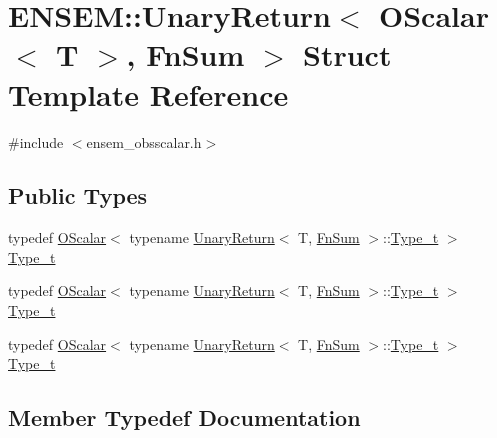\hypertarget{structENSEM_1_1UnaryReturn_3_01OScalar_3_01T_01_4_00_01FnSum_01_4}{}\section{E\+N\+S\+EM\+:\+:Unary\+Return$<$ O\+Scalar$<$ T $>$, Fn\+Sum $>$ Struct Template Reference}
\label{structENSEM_1_1UnaryReturn_3_01OScalar_3_01T_01_4_00_01FnSum_01_4}


{\ttfamily \#include $<$ensem\+\_\+obsscalar.\+h$>$}

\subsection*{Public Types}
\begin{DoxyCompactItemize}
\item 
typedef \mbox{\hyperlink{classENSEM_1_1OScalar}{O\+Scalar}}$<$ typename \mbox{\hyperlink{structENSEM_1_1UnaryReturn}{Unary\+Return}}$<$ T, \mbox{\hyperlink{structENSEM_1_1FnSum}{Fn\+Sum}} $>$\+::\mbox{\hyperlink{structENSEM_1_1UnaryReturn_3_01OScalar_3_01T_01_4_00_01FnSum_01_4_a02ee406ef93cadbda63ffae33a8ef25a}{Type\+\_\+t}} $>$ \mbox{\hyperlink{structENSEM_1_1UnaryReturn_3_01OScalar_3_01T_01_4_00_01FnSum_01_4_a02ee406ef93cadbda63ffae33a8ef25a}{Type\+\_\+t}}
\item 
typedef \mbox{\hyperlink{classENSEM_1_1OScalar}{O\+Scalar}}$<$ typename \mbox{\hyperlink{structENSEM_1_1UnaryReturn}{Unary\+Return}}$<$ T, \mbox{\hyperlink{structENSEM_1_1FnSum}{Fn\+Sum}} $>$\+::\mbox{\hyperlink{structENSEM_1_1UnaryReturn_3_01OScalar_3_01T_01_4_00_01FnSum_01_4_a02ee406ef93cadbda63ffae33a8ef25a}{Type\+\_\+t}} $>$ \mbox{\hyperlink{structENSEM_1_1UnaryReturn_3_01OScalar_3_01T_01_4_00_01FnSum_01_4_a02ee406ef93cadbda63ffae33a8ef25a}{Type\+\_\+t}}
\item 
typedef \mbox{\hyperlink{classENSEM_1_1OScalar}{O\+Scalar}}$<$ typename \mbox{\hyperlink{structENSEM_1_1UnaryReturn}{Unary\+Return}}$<$ T, \mbox{\hyperlink{structENSEM_1_1FnSum}{Fn\+Sum}} $>$\+::\mbox{\hyperlink{structENSEM_1_1UnaryReturn_3_01OScalar_3_01T_01_4_00_01FnSum_01_4_a02ee406ef93cadbda63ffae33a8ef25a}{Type\+\_\+t}} $>$ \mbox{\hyperlink{structENSEM_1_1UnaryReturn_3_01OScalar_3_01T_01_4_00_01FnSum_01_4_a02ee406ef93cadbda63ffae33a8ef25a}{Type\+\_\+t}}
\end{DoxyCompactItemize}


\subsection{Member Typedef Documentation}
\mbox{\label{structENSEM_1_1UnaryReturn_3_01OScalar_3_01T_01_4_00_01FnSum_01_4_a02ee406ef93cadbda63ffae33a8ef25a}} 

